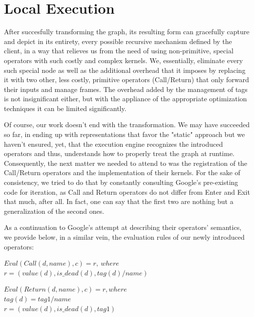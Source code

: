 \documentclass[ack,preface]{dithesis}
\begin{document}
    \section{Local Execution}


After succesfully transforming the graph, its resulting form can gracefully capture and depict in its entirety, every possible recursive mechanism defined by the client, in a way that relieves us from the need of using non-primitive, special operators with such costly and complex kernels. We, essentially,  eliminate every such special node as well as the additional overhead that it imposes by replacing it with two other, less costly, primitive operators (Call/Return) that only forward their inputs and manage frames.  The overhead added by the management of tags is not insignificant either, but with the appliance of the appropriate optimization techniques it can be limited significantly.

Of course, our work doesn't end with the transformation. We may have succeeded so far, in ending up with representations that favor the "static" approach but we haven't ensured, yet, that the  execution engine recognizes the introduced operators and thus, understands how to properly treat the graph at runtime. Consequently, the next matter we needed to attend to was the registration of the Call/Return operators and the implementation of their kernels.  For the sake of consistency, we tried to do that by constantly consulting Google's pre-existing code for iteration, as Call and Return operators do not differ from Enter and Exit that much, after all. In fact, one can say that the first two are nothing but a generalization of the second ones. 


As a continuation to Google's attempt at describing their operators' semantics, we provide below, in a similar vein, the evaluation rules of our newly introduced operators:

\begin{flushleft}
$Eval(Call(d, name), c) = r,\  where$ \\
\setlength{\parindent}{5ex} $r = (value(d), is\_dead(d), tag(d)/name)$
\end{flushleft}

\begin{flushleft}
$Eval(Return(d, name), c) = r, where \ $ \\
\setlength{\parindent}{5ex} $tag(d) = tag1/name$\\
$ r = (value(d), is\_dead(d), tag1)$
\end{flushleft}
\end{document}
